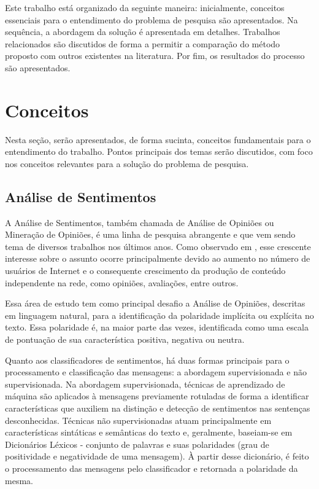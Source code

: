 \documentclass[12pt]{article}
\begin{document}
Este trabalho está organizado da seguinte maneira: inicialmente, conceitos essenciais para o entendimento do problema de pesquisa são apresentados. Na sequência, a abordagem da solução é apresentada em detalhes. Trabalhos relacionados são discutidos de forma a permitir a comparação do método proposto com outros existentes na literatura. Por fim, os resultados do processo são apresentados.

\section{Conceitos}

Nesta seção, serão apresentados, de forma sucinta, conceitos fundamentais para o entendimento do trabalho. Pontos principais dos temas serão discutidos, com foco nos conceitos relevantes para a solução do problema de pesquisa.

\subsection{Análise de Sentimentos}
A Análise de Sentimentos, também chamada de Análise de Opiniões ou Mineração de Opiniões, é uma linha de pesquisa abrangente e que vem sendo tema de diversos trabalhos nos últimos anos. Como observado em \cite{liu2010multifaceted}, esse crescente interesse sobre o assunto ocorre principalmente devido ao aumento no número de usuários de Internet e o consequente crescimento da produção de conteúdo independente na rede, como opiniões, avaliações, entre outros. 

Essa área de estudo tem como principal desafio a Análise de Opiniões, descritas em linguagem natural, para a identificação da polaridade implícita ou explícita no texto. Essa polaridade é, na maior parte das vezes, identificada como uma escala de pontuação de sua característica positiva, negativa ou neutra.

Quanto aos classificadores de sentimentos, há duas formas principais para o processamento e classificação das mensagens: a abordagem supervisionada e não supervisionada. Na abordagem supervisionada, técnicas de aprendizado de máquina são aplicados à mensagens previamente rotuladas de forma a identificar características que auxiliem na distinção e detecção de sentimentos nas sentenças desconhecidas. Técnicas não supervisionadas atuam principalmente em características sintáticas e semânticas do texto e, geralmente, baseiam-se em Dicionários Léxicos - conjunto de palavras e suas polaridades (grau de positividade e negatividade de uma mensagem). À partir desse dicionário, é feito o processamento das mensagens pelo classificador e retornada a polaridade da mesma. \cite{araujo2013metodos}
\end{document}
